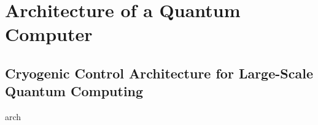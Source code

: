 \chapter{Architecture of a Quantum Computer}

\clearpage
\section{Cryogenic Control Architecture for Large-Scale Quantum Computing}
\label{sec:primelines}
{arch}